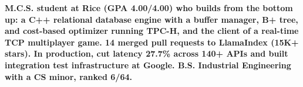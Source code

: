 %
\item\small{\textbf{M.C.S. student at Rice (GPA \textbf{4.00/4.00}) who builds from the bottom up: a \textbf{C++} relational database engine with a buffer manager, \textbf{B+ tree}, and cost-based optimizer running \textbf{TPC-H}, and the client of a real-time TCP multiplayer game. \textbf{14} merged pull requests to \textbf{LlamaIndex} (\textbf{15K+} stars). In production, cut latency \textbf{27.7\%} across \textbf{140+} APIs and built integration test infrastructure at \textbf{Google}. B.S. Industrial Engineering with a CS minor, ranked \textbf{6/64}.}}%
